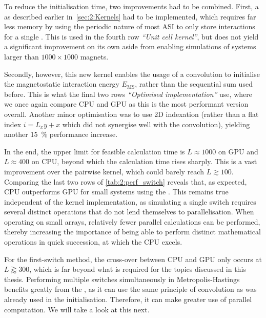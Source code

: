 To reduce the initialisation time, two improvements had to be combined.
First, a  as described earlier in~\cref{sec:2:Kernels} had to be implemented, which requires far less memory by using the periodic nature of most ASI to only store interactions for a single .
This is used in the fourth row \textit{``Unit cell kernel''}, but does not yield a significant improvement on its own aside from enabling simulations of systems larger than $1000 \times 1000$ magnets. \par
Secondly, however, this new kernel enables the usage of a convolution to initialise the magnetostatic interaction energy $E_\mathrm{MS}$, rather than the sequential sum used before.
This is what the final two rows \textit{``Optimised implementation''} use, where we once again compare CPU and GPU as this is the most performant version overall.
Another minor optimisation was to use 2D indexation (rather than a flat index $i = L_x y + x$ which did not synergise well with the convolution), yielding another \SI{15}{\percent} performance increase. \\\par

In the end, the upper limit for feasible calculation time is $L \approx 1000$ on GPU and $L \approx 400$ on CPU, beyond which the calculation time rises sharply.
This is a vast improvement over the pairwise kernel, which could barely reach $L \gtrsim 100$.
Comparing the last two rows of \cref{tab:2:perf_switch} reveals that, as expected, CPU outperforms GPU for small systems using the .
This remains true independent of the kernel implementation, as simulating a single switch requires several distinct operations that do not lend themselves to parallelisation.
When operating on small arrays, relatively fewer parallel calculations can be performed, thereby increasing the importance of being able to perform distinct mathematical operations in quick succession, at which the CPU excels. \par
For the first-switch method, the cross-over between CPU and GPU only occurs at $L \gtrapprox 300$, which is far beyond what is required for the topics discussed in this thesis.
Performing multiple switches simultaneously in Metropolis-Hastings benefits greatly from the , as it can use the same principle of convolution as was already used in the initialisation.
Therefore, it can make greater use of parallel computation.
We will take a look at this next.

